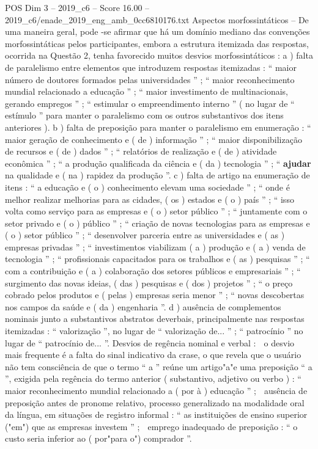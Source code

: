 \begin{textsample}{POS Dim 3 – 2019\_c6 – Score 16.00 – 2019\_c6/enade\_2019\_eng\_amb\_0cc6810176.txt}
Aspectos morfossintáticos – De uma maneira geral, pode -se afirmar que há um domínio mediano das convenções morfossintáticas pelos participantes, embora a estrutura itemizada das respostas, ocorrida na Questão 2, tenha favorecido muitos desvios morfossintáticos : a ) falta de paralelismo entre elementos que introduzem respostas itemizadas : “ maior número de doutores formados pelas universidades ” ; “ maior reconhecimento mundial relacionado a educação ” ; “ maior investimento de multinacionais, gerando empregos ” ; “ estimular o empreendimento interno ” ( no lugar de “ estímulo ” para manter o paralelismo com os outros substantivos dos itens anteriores ). b ) falta de preposição para manter o paralelismo em enumeração : “ maior geração de conhecimento e ( de ) informação ” ; “ maior disponibilização de recursos e ( de ) dados ” ; “ relatórios de realização e ( de ) atividade econômica ” ; “ a produção qualificada da ciência e ( da ) tecnologia ” ; “ \textbf{ajudar} na qualidade e ( na ) rapidez da produção ”. c ) falta de artigo na enumeração de itens : “ a educação e ( o ) conhecimento elevam uma sociedade ” ; “ onde é melhor realizar melhorias para as cidades, ( os ) estados e ( o ) país ” ; “ isso volta como serviço para as empresas e ( o ) setor público ” ; “ juntamente com o setor privado e ( o ) público ” ; “ criação de novas tecnologias para as empresas e ( o ) setor público ” ; “ desenvolver parceria entre as universidades e ( as ) empresas privadas ” ; “ investimentos viabilizam ( a ) produção e ( a ) venda de tecnologia ” ; “ profissionais capacitados para os trabalhos e ( as ) pesquisas ” ; “ com a contribuição e ( a ) colaboração dos setores públicos e empresariais ” ; “ surgimento das novas ideias, ( das ) pesquisas e ( dos ) projetos ” ; “ o preço cobrado pelos produtos e ( pelas ) empresas seria menor ” ; “ novas descobertas nos campos da saúde e ( da ) engenharia ”. d ) ausência de complementos nominais junto a substantivos abstratos deverbais, principalmente nas respostas itemizadas : “ valorização ”, no lugar de “ valorização de... ” ; “ patrocínio ” no lugar de “ patrocínio de... ”.
Desvios de regência nominal e verbal :  o desvio mais frequente é a falta do sinal indicativo da crase, o que revela que o usuário não tem consciência de que o termo “ a ” reúne um artigo"a"e uma preposição “ a ”, exigida pela regência do termo anterior ( substantivo, adjetivo ou verbo ) : “ maior reconhecimento mundial relacionado a ( por à ) educação ” ;  ausência de preposição antes de pronome relativo, processo generalizado na modalidade oral da língua, em situações de registro informal : “ as instituições de ensino superior ("em") que as empresas investem ” ;  emprego inadequado de preposição : “ o custo seria inferior ao ( por"para o") comprador ”.

\end{textsample}
